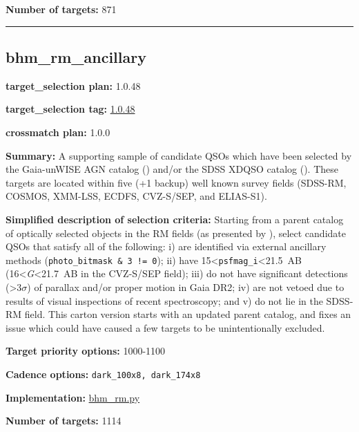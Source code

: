 \noindent\textbf{Number of targets:} 871

\begin{center}\rule{0.5\linewidth}{0.5pt}\end{center}

\hypertarget{bhm_rm_ancillary_plan1.0.48}{%
\subsection{bhm\_rm\_ancillary}\label{bhm_rm_ancillary_plan1.0.48}}

\noindent\textbf{target\_selection plan:} 1.0.48

\noindent\textbf{target\_selection tag:}
\href{https://github.com/sdss/target_selection/tree/1.0.48/}{1.0.48}

\noindent\textbf{crossmatch plan:} 1.0.0

\noindent\textbf{Summary:} A supporting sample of candidate QSOs which have been
selected by the Gaia-unWISE AGN catalog
(\citealt{Shu2019}) and/or the SDSS XDQSO catalog
(\citealt{Bovy2011}). These targets are located within five (+1 backup) well
known survey fields (SDSS-RM, COSMOS, XMM-LSS, ECDFS, CVZ-S/SEP, and
ELIAS-S1).

\noindent\textbf{Simplified description of selection criteria:} Starting from a
parent catalog of optically selected objects in the RM fields (as
presented by
\citealt{Yang2022}), select candidate QSOs that satisfy all of the
following: i) are identified via external ancillary methods
(\texttt{photo\_bitmask\ \&\ 3\ !=\ 0}); ii) have
15\textless{}\texttt{psfmag\_i}\textless21.5~AB
(16\textless{}\emph{G}\textless21.7~AB in the CVZ-S/SEP field); iii) do
not have significant detections (\textgreater3$\sigma$) of parallax and/or
proper motion in Gaia DR2; iv) are not vetoed due to results of visual
inspections of recent spectroscopy; and v) do not lie in the SDSS-RM
field. This carton version starts with an updated parent catalog, and
fixes an issue which could have caused a few targets to be
unintentionally excluded.


\noindent\textbf{Target priority options:} 1000-1100

\noindent\textbf{Cadence options:} \texttt{dark\_100x8,\ dark\_174x8}

\noindent\textbf{Implementation:}
\href{https://github.com/sdss/target_selection/blob/1.0.48/python/target_selection/cartons/bhm_rm.py}{bhm\_rm.py}

\noindent\textbf{Number of targets:} 1114

